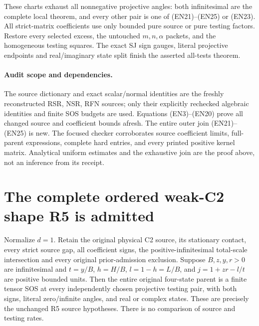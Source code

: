 These charts exhaust all nonnegative projective angles:
both infinitesimal are the complete local theorem, and every other
pair is one of (EN21)--(EN25) or (EN23).
All strict-matrix coefficients use only bounded pure source or
pure testing factors. Restore every selected excess, the untouched
$m,n,\alpha$ packets, and the homogeneous testing squares.
The exact SJ sign gauges, literal projective endpoints and
real/imaginary state split finish the asserted all-tests theorem.

\paragraph{Audit scope and dependencies.}
The source dictionary and exact scalar/normal identities are the
freshly reconstructed RSR, NSR, RFN sources; only their explicitly
rechecked algebraic identities and finite SOS budgets are used.
Equations (EN3)--(EN20) prove all changed source and coefficient
bounds afresh. The entire outer join (EN21)--(EN25) is new.
The focused checker corroborates source coefficient limits,
full-parent expressions, complete hard entries, and every printed
positive kernel matrix. Analytical uniform estimates and the
exhaustive join are the proof above, not an inference from its receipt.


\section{\texorpdfstring{The complete ordered weak-C2 shape R5 is admitted}{The complete ordered weak-C2 shape R5 is admitted}}
\label{component:p8da9ea6ed9e5}

\label{p8da9ea6ed9e5:sec:r17-r5}

\begin{theorem}
Normalize $d=1$. Retain the original physical C2 source, its stationary contact, every strict
source gap, all coefficient signs, the positive-infinitesimal total-scale
intersection and every original prior-admission exclusion. Suppose
$B,z,y,r>0$ are infinitesimal and $t=y/B$, $h=H/B$, $l=1-h=L/B$,
and $j=1+zr-l/t$ are positive bounded units. Then the entire original
four-state parent is a finite tensor SOS at every independently chosen
projective testing pair, with both signs, literal zero/infinite angles,
and real or complex states. These are precisely the unchanged R5 source
hypotheses. There is no comparison of source and testing rates.
\end{theorem}

